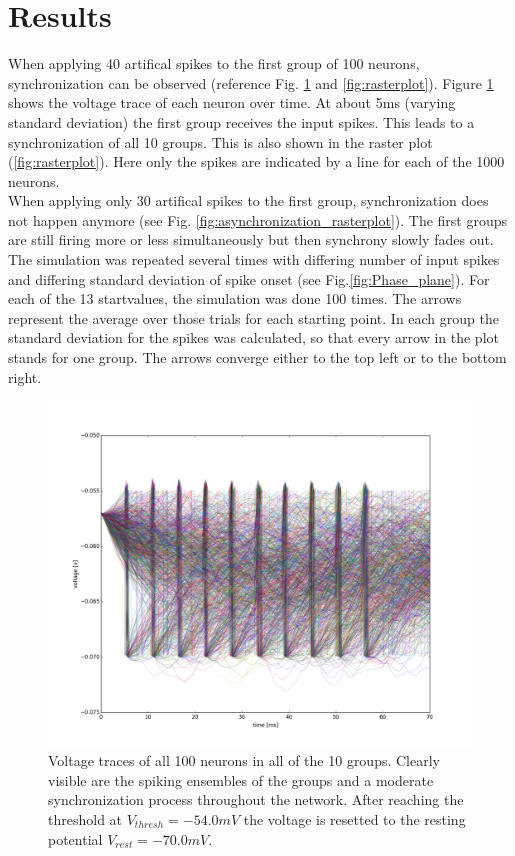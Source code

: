 \documentclass[12pt,a4paper, bibliography=totoc, listof=numbered, footexclude]{scrartcl}
\begin{document}
  
  \section{Results}

  When applying 40 artifical spikes to the first group of 100 neurons, synchronization can be observed (reference Fig. \ref{fig:voltageplot_synchronization} and \ref{fig:rasterplot}). Figure  \ref{fig:voltageplot_synchronization} shows the voltage trace of each neuron over time. At about 5ms (varying standard deviation) the first group receives the input spikes. This leads to a synchronization of all 10 groups. This is also shown in the raster plot (\ref{fig:rasterplot}). Here only the spikes are indicated by a line for each of the 1000 neurons.\\
  When applying only 30 artifical spikes to the first group, synchronization does not happen anymore (see Fig. \ref{fig:asynchronization_rasterplot}). The first groups are still firing more or less simultaneously but then synchrony slowly fades out.\\  
  The simulation was repeated several times with differing number of input spikes and differing standard deviation of spike onset (see Fig.\ref{fig:Phase_plane}). For each of the 13 startvalues, the simulation was done 100 times. The arrows represent the average over those trials for each starting point. In each group the standard deviation for the spikes was calculated, so that every arrow in the plot stands for one group. The arrows converge either to the top left or to the bottom right.
  
  \begin{figure}[H]
  \centering
  \includegraphics[width=0.9\linewidth]{./Plots/Our_Plots/voltageplot}
  \caption{Voltage traces of all 100 neurons in all of the 10 groups. Clearly visible are the spiking ensembles of the groups and a moderate synchronization process throughout the network. After reaching the threshold at $V_{thresh}=-54.0 mV$ the voltage is resetted to the resting potential $V_{rest}=-70.0 mV$. }
  \label{fig:voltageplot_synchronization}
  \end{figure}
\end{document}
